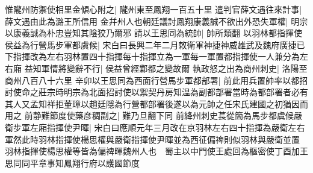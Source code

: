 惟隴州防禦使相里金傾心附之|{
	隴州東至鳳翔一百五十里}
遣判官薛文遇往來計事|{
	薛文遇由此為潞王所信用}
金幷州人也朝廷議討鳳翔康義誠不欲出外恐失軍權|{
	明宗以康義誠為朴忠豈知其陰狡乃爾邪}
請以王思同為統帥|{
	帥所類翻}
以羽林都指揮使侯益為行營馬步軍都虞候|{
	宋白曰長興二年二月敇衛軍神捷神威雄武及魏府廣捷已下指揮改為左右羽林置四十指揮每十指揮立為一軍每一軍置都指揮使一人兼分為左右廂}
益知軍情將變辭不行|{
	侯益曾經鄴都之變故爾}
執政怒之出為商州刺史|{
	洛陽至商州八百八十六里}
辛卯以王思同為西面行營馬步軍都部署|{
	前此用兵置帥率以都招討使命之莊宗時明宗為北面招討使以禦契丹房知温為副都部署當時為都部署者必有其人又孟知祥拒董璋以趙廷隱為行營都部署後遂以為元帥之任宋氏建國之初猶因而用之}
前静難節度使藥彦稠副之|{
	難乃旦翻下同}
前絳州刺史萇從簡為馬步都虞候嚴衛步軍左廂指揮使尹暉|{
	宋白曰應順元年三月改在京羽林左右四十指揮為嚴衛左右軍然此時羽林指揮使楊思權與嚴衛指揮使尹暉並為西征偏禆則似羽林與嚴衛並置}
羽林指揮使楊思權等皆為偏禆暉魏州人也　蜀主以中門使王處回為樞密使丁酉加王思同同平章事知鳳翔行府以護國節度

